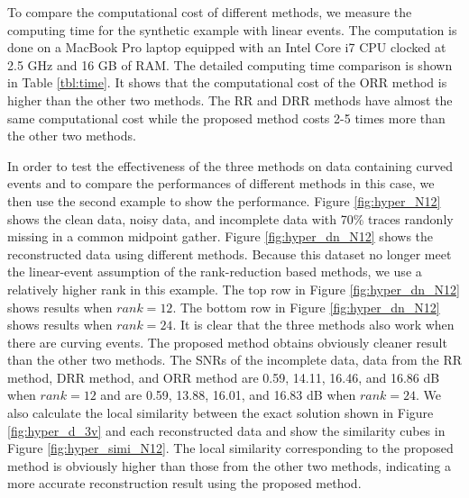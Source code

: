 {To compare the computational cost of different methods, we measure the computing time for the synthetic example with linear events. The computation is done on a MacBook Pro laptop equipped with an Intel Core i7 CPU clocked at 2.5 GHz and 16 GB of RAM. The detailed computing time comparison is shown in Table \ref{tbl:time}. It shows that the computational cost of the ORR method is higher than the other two methods.  The RR and DRR methods have almost the same computational cost while the proposed method costs 2-5 times more than the other two methods. 

In order to test the effectiveness of the three methods on data containing curved events and to compare the performances of different methods in this case, we then use the second example to show the performance.  Figure \ref{fig:hyper_N12} shows the clean data, noisy data, and incomplete data with 70\% traces randonly missing in a common midpoint gather. Figure \ref{fig:hyper_dn_N12} shows the reconstructed data using different methods. Because this dataset no longer meet the linear-event assumption of the rank-reduction based methods, we use a relatively higher rank in this example. The top row in Figure \ref{fig:hyper_dn_N12} shows results when $rank = 12$. The bottom row in Figure \ref{fig:hyper_dn_N12} shows results when $rank = 24$. It is clear that the three methods also work when there are curving events. The proposed method obtains obviously cleaner result than the other two methods. The SNRs of the incomplete data, data from the RR method, DRR method, and ORR method are 0.59, 14.11, 16.46, and 16.86 dB when $rank=12$ and are 0.59, 13.88, 16.01, and 16.83 dB when $rank=24$. We also calculate the local similarity between the exact solution shown in Figure \ref{fig:hyper_d_3v} and each reconstructed data and show the similarity cubes in Figure \ref{fig:hyper_simi_N12}. The local similarity corresponding to the proposed method is obviously higher than those from the  other two methods, indicating a more accurate reconstruction result using the proposed method. 

}
